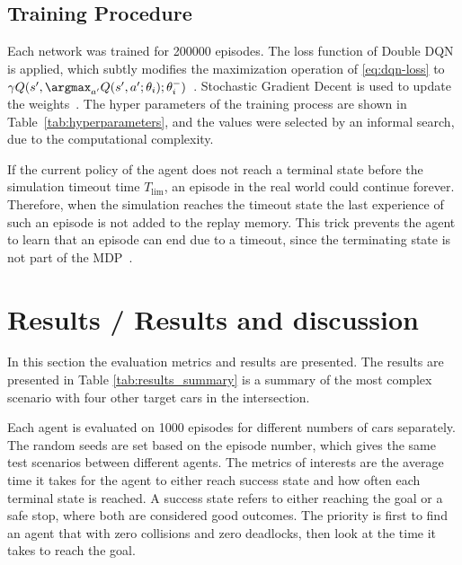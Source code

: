 	\subsection{Training Procedure}
	Each network was trained for \num{200000} episodes. The loss function of Double DQN is applied, which subtly modifies the maximization operation of \ref{eq:dqn-loss} to $\gamma Q(s',\argmax_{a'} Q(s',a';\theta_i);\theta_i^-)$~\cite{Hasselt2016}. 
	Stochastic Gradient Decent is used to update the weights~\cite{Kingma2014}. The hyper parameters of the training process are shown in Table~\ref{tab:hyperparameters}, and the values were selected by an informal search, due to the computational complexity. 
	
	If the current policy of the agent does not reach a terminal state before the simulation timeout time $T_\mathrm{lim}$, an episode in the real world could continue forever. Therefore, when the simulation reaches the timeout state the last experience of such an episode is not added to the replay memory. This trick prevents the agent to learn that an episode can end due to a timeout, since the terminating state is not part of the MDP~\cite{Hoel2018}.
	
	\section{Results / Results and discussion}
	\label{sec:results}
	In this section the evaluation metrics and results are presented. The results are presented in Table \ref{tab:results_summary} is a summary of the most complex scenario with four other target cars in the intersection. 
	
	Each agent is evaluated on \num{1000} episodes for different numbers of cars separately. The random seeds are set based on the episode number, which gives the same test scenarios between different agents.
	The metrics of interests are the average time it takes for the agent to either reach success state and how often each terminal state is reached. A success state refers to either reaching the goal or a safe stop, where both are considered good outcomes. The priority is first to find an agent that with zero collisions and zero deadlocks, then look at the time it takes to reach the goal. 
	
